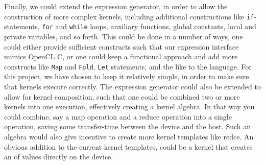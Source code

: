 Finally, we could extend the expression generator, in order to allow
the construction of more complex kernels, including additional
constructions like \texttt{if}-statements, \texttt{for} and
\texttt{while} loops, auxiliary functions, global constants, local and
private variables, and so forth. This could be done in a number of
ways, one could either provide sufficient constructs such that our
expression interface mimics OpenCL C, or one could keep a functional
approach and add more constructs like \texttt{Map} and \texttt{Fold},
\texttt{Let} statements, and the like to the language. For this
project, we have chosen to keep it relatively simple, in order to make
sure that kernels execute correctly. The expression generator could
also be extended to allow for kernel composition, such that one could
be combined two or more kernels into one execution, effectively
creating a kernel algebra. In that way you could combine, say a map
operation and a reduce operation into a single operation, saving some
transfer-time between the device and the host. Such an algebra would
also give incentive to create more kernel templates like redce. An
obvious addition to the current kernel templates, could be a kernel
that creates an of values directly on the device.
